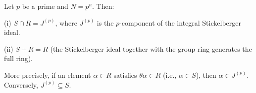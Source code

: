 Let $p$ be a prime and $N = p^n$. Then:

(i) $S \cap R = J^{(p)}$, where $J^{(p)}$ is the $p$-component of the integral
Stickelberger ideal.

(ii) $S + R = R$ (the Stickelberger ideal together with the group ring generates
the full ring).

More precisely, if an element $\alpha \in R$ satisfies $\theta \alpha \in R$ (i.e.,
$\alpha \in S$), then $\alpha \in J^{(p)}$. Conversely, $J^{(p)} \subseteq S$.
